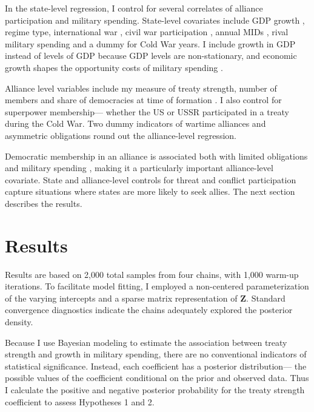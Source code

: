 \documentclass[12pt]{article}
\begin{document}
In the state-level regression, I control for several correlates of alliance participation and military spending. 
State-level covariates include GDP growth \citep{Boltetal2018}, regime type, international war \citep{Reiteretal2016}, civil war participation \citep{SarkeesWayman2010}, annual MIDs \citep{Gibleretal2016}, rival military spending \citep{ThompsonDreyer2012} and a dummy for Cold War years.
I include growth in GDP instead of levels of GDP because GDP levels are non-stationary, and economic growth shapes the opportunity costs of military spending \citep{Kimball2010, Zielinskietal2017}.


Alliance level variables include my measure of treaty strength, number of members and share of democracies at time of formation \citep{Chibaetal2015}.
I also control for superpower membership--- whether the US or USSR participated in a treaty during the Cold War. 
Two dummy indicators of wartime alliances and asymmetric obligations \citep{Leedsetal2002} round out the alliance-level regression. 


Democratic membership in an alliance is associated both with limited obligations \citep{Chibaetal2015} and military spending \citep{DigiuseppePoast2016}, making it a particularly important alliance-level covariate.  
State and alliance-level controls for threat and conflict participation capture situations where states are more likely to seek allies. 
The next section describes the results.
 

\section{Results}


Results are based on 2,000 total samples from four chains, with 1,000 warm-up iterations. 
To facilitate model fitting, I employed a non-centered parameterization of the varying intercepts and a sparse matrix representation of \textbf{Z}. 
Standard convergence diagnostics indicate the chains adequately explored the posterior density.  


Because I use Bayesian modeling to estimate the association between treaty strength and growth in military spending, there are no conventional indicators of statistical significance. 
Instead, each coefficient has a posterior distribution--- the possible values of the coefficient conditional on the prior and observed data. 
Thus I calculate the positive and negative posterior probability for the treaty strength coefficient to assess Hypotheses 1 and 2.
\end{document}
